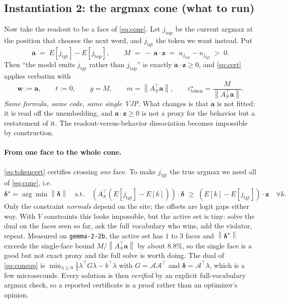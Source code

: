 \documentclass[11pt]{article}
\newcommand{\vz}{\bm{z}}
\newcommand{\vw}{\bm{w}}
\newcommand{\va}{\bm{a}}
\newcommand{\vd}{\bm{\delta}}
\newcommand{\norm}[1]{\left\lVert #1 \right\rVert}
\begin{document}
\subsection{Instantiation 2: the argmax cone (what to run)}

Now take the readout to be a face of \eqref{eq:cone}. Let $j_{\mathrm{top}}$ be the
current argmax at the position that chooses the next word, and $j_{\mathrm{tgt}}$ the
token we want instead. Put
\begin{equation}
  \va \;=\; E[j_{\mathrm{tgt}}] - E[j_{\mathrm{top}}], \qquad
  M \;=\; -\,\va\cdot\vz \;=\; u_{j_{\mathrm{top}}} - u_{j_{\mathrm{tgt}}} \;>\; 0 .
  \label{eq:margin}
\end{equation}
Then ``the model emits $j_{\mathrm{tgt}}$ rather than $j_{\mathrm{top}}$'' is exactly
$\va\cdot\vz \ge 0$, and \eqref{eq:cert} applies verbatim with
\begin{equation}
  \boxed{\;\vw := \va, \qquad t := 0, \qquad g = M, \qquad
  m = \norm{A_S^{\!\top}\va}, \qquad
  \varepsilon^\star_{\text{token}} = \frac{M}{\norm{A_S^{\!\top}\va}} .\;}
  \label{eq:tokencert}
\end{equation}
\emph{Same formula, same code, same single VJP.} What changes is that $\va$ is not
fitted: it is read off the unembedding, and $\va\cdot\vz \ge 0$ is not a proxy for the
behavior but a restatement of it. The readout-versus-behavior dissociation becomes
impossible by construction.

\paragraph{From one face to the whole cone.} \eqref{eq:tokencert} certifies crossing
\emph{one} face. To make $j_{\mathrm{tgt}}$ the true argmax we need all of
\eqref{eq:cone}, i.e.
\begin{equation}
  \vd^\star = \arg\min \norm{\vd} \quad \text{s.t.} \quad
  \left(A_S^{\!\top}(E[j_{\mathrm{tgt}}]-E[k])\right)\cdot \vd \;\ge\;
  (E[k]-E[j_{\mathrm{tgt}}])\cdot\vz \quad \forall k .
  \label{eq:coneqp}
\end{equation}
Only the constraint \emph{normals} depend on the site; the offsets are logit gaps
either way. With $V$ constraints this looks impossible, but the active set is tiny:
solve the dual on the faces seen so far, ask the full vocabulary who wins, add the
violator, repeat. Measured on \texttt{gemma-2-2b}, the active set has $1$ to $3$
faces and $\norm{\vd^\star}$ exceeds the single-face bound
$M/\norm{A_S^{\!\top}\va}$ by about $8.8\%$, so the single face is a good but not
exact proxy and the full solve is worth doing. The dual of \eqref{eq:coneqp} is
$\min_{\lambda \ge 0} \tfrac12 \lambda^{\!\top} G \lambda - b^{\!\top}\lambda$ with
$G = \mathcal{A}\mathcal{A}^{\!\top}$ and $\vd = \mathcal{A}^{\!\top}\lambda$, which is
a few microseconds. Every solution is then \emph{verified} by an explicit
full-vocabulary argmax check, so a reported certificate is a proof rather than an
optimizer's opinion.
\end{document}
